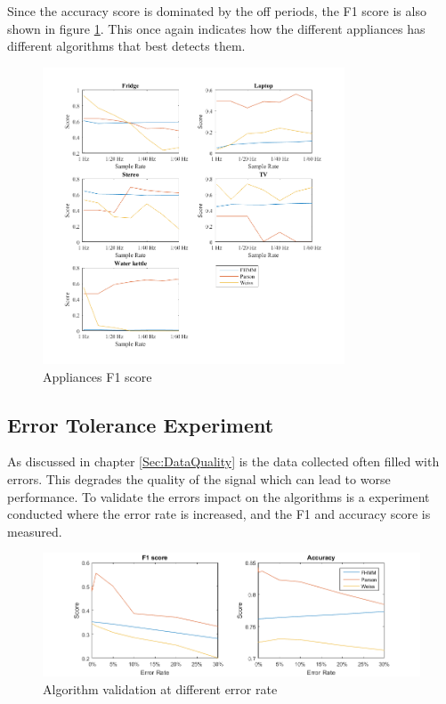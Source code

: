 Since the accuracy score is dominated by the off periods, the F1 score is also shown in figure \ref{fig:AppF1}. This once again indicates how the different appliances has different algorithms that best detects them.  


\begin{figure}[H]
\centering
\includegraphics[width=0.8\textwidth]{billeder/App-F1Score.png}
\caption{Appliances F1 score}
\label{fig:AppF1}
\end{figure}

\newpage

\subsection{Error Tolerance Experiment}
\label{Sec:ETE}
As discussed in chapter \ref{Sec:DataQuality} is the data collected often filled with errors. This degrades the quality of the signal which can lead to worse performance. To validate the errors impact on the algorithms is a experiment conducted where the error rate is increased, and the F1 and accuracy score is measured. 

\begin{figure}[H]
\centering
\includegraphics[width=1\textwidth]{billeder/AlgoErrorRate.png}
\caption{Algorithm validation at different error rate}
\label{fig:ErrorEx}
\end{figure}

